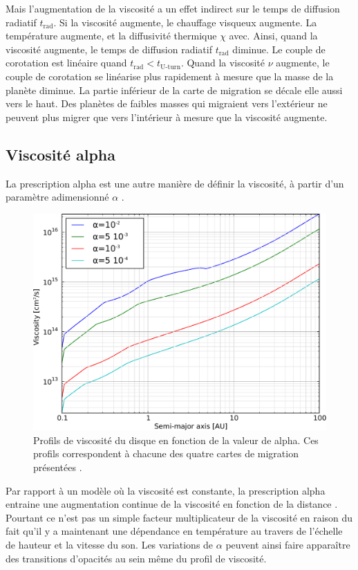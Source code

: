 Mais l'augmentation de la viscosité a un effet indirect sur le temps de diffusion radiatif $t_\text{rad}$. Si la viscosité augmente, le chauffage visqueux augmente. La température augmente, et la diffusivité thermique $\chi$ avec. Ainsi, quand la viscosité augmente, le temps de diffusion radiatif $t_\text{rad}$ diminue. Le couple de corotation est linéaire quand $t_\text{rad} < t_\text{U-turn}$. Quand la viscosité $\nu$ augmente, le couple de corotation se linéarise plus rapidement à mesure que la masse de la planète diminue. La partie inférieur de la carte de migration se décale elle aussi vers le haut. Des planètes de faibles masses qui migraient vers l'extérieur ne peuvent plus migrer que vers l'intérieur à mesure que la viscosité augmente. 

\subsection{Viscosité alpha}
La prescription alpha \citep{shakura1973black} est une autre manière de définir la viscosité, à partir d'un paramètre adimensionné $\alpha$ .

\begin{figure}[htb]
\centering
\includegraphics[width=0.6\linewidth]{figure/migration_map/viscosity/alpha_profiles.pdf}
\caption{Profils de viscosité du disque en fonction de la valeur de alpha. Ces profils correspondent à chacune des quatre cartes de migration
présentées \protect{}. }\label{fig:alpha_profiles}
\end{figure}

Par rapport à un modèle où la viscosité est constante, la prescription alpha entraine une augmentation continue de la viscosité en fonction de la distance . Pourtant ce n'est pas un simple facteur multiplicateur de la viscosité en raison du fait qu'il y a maintenant une dépendance en température au travers de l'échelle de hauteur et la vitesse du son. Les variations de $\alpha$ peuvent ainsi faire apparaître des transitions d'opacités au sein même du profil de viscosité. 

